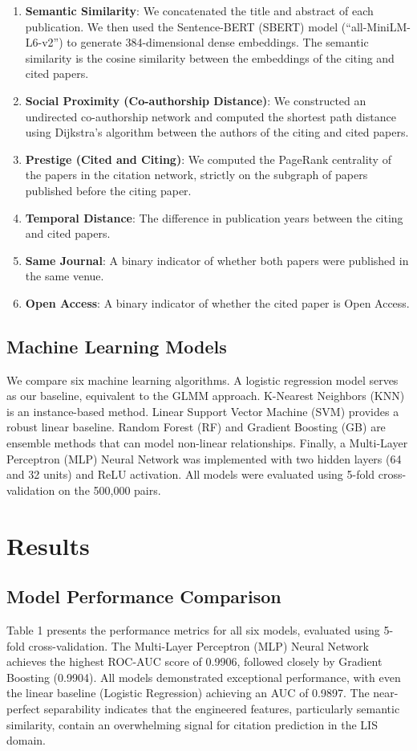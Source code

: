 \documentclass[11pt,a4paper]{article}
\begin{document}
\begin{enumerate}
    \item \textbf{Semantic Similarity}: We concatenated the title and abstract of each publication. We then used the Sentence-BERT (SBERT) model (``all-MiniLM-L6-v2'') to generate 384-dimensional dense embeddings. The semantic similarity is the cosine similarity between the embeddings of the citing and cited papers.
    \item \textbf{Social Proximity (Co-authorship Distance)}: We constructed an undirected co-authorship network and computed the shortest path distance using Dijkstra's algorithm between the authors of the citing and cited papers.
    \item \textbf{Prestige (Cited and Citing)}: We computed the PageRank centrality of the papers in the citation network, strictly on the subgraph of papers published before the citing paper.
    \item \textbf{Temporal Distance}: The difference in publication years between the citing and cited papers.
    \item \textbf{Same Journal}: A binary indicator of whether both papers were published in the same venue.
    \item \textbf{Open Access}: A binary indicator of whether the cited paper is Open Access.
\end{enumerate}

\subsection{Machine Learning Models}
We compare six machine learning algorithms. A logistic regression model serves as our baseline, equivalent to the GLMM approach. K-Nearest Neighbors (KNN) is an instance-based method. Linear Support Vector Machine (SVM) provides a robust linear baseline. Random Forest (RF) and Gradient Boosting (GB) are ensemble methods that can model non-linear relationships. Finally, a Multi-Layer Perceptron (MLP) Neural Network was implemented with two hidden layers (64 and 32 units) and ReLU activation. All models were evaluated using 5-fold cross-validation on the 500,000 pairs.

\section{Results}

\subsection{Model Performance Comparison}
Table 1 presents the performance metrics for all six models, evaluated using 5-fold cross-validation. The Multi-Layer Perceptron (MLP) Neural Network achieves the highest ROC-AUC score of 0.9906, followed closely by Gradient Boosting (0.9904). All models demonstrated exceptional performance, with even the linear baseline (Logistic Regression) achieving an AUC of 0.9897. The near-perfect separability indicates that the engineered features, particularly semantic similarity, contain an overwhelming signal for citation prediction in the LIS domain.
\end{document}
